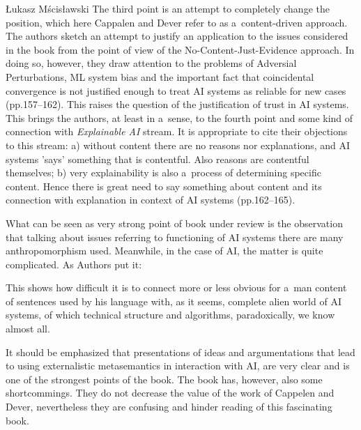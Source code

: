 \begin{newrevengenv}{Łukasz Mścisławski}
The third point is an attempt to completely change the position, which here Cappalen and Dever refer to as a~content-driven approach. The authors sketch an attempt to justify an application to the issues considered in the book from the point of view of the No-Content-Just-Evidence approach. In doing so, however, they draw attention to the problems of Adversial Perturbations, ML system bias and the important fact that coincidental convergence is not justified enough to treat AI systems as reliable for new cases (pp.157--162). This raises the question of the justification of trust in AI systems. This brings the authors, at least in a~sense, to the fourth point and some kind of connection with \textit{Explainable AI} stream. It is appropriate to cite their objections to this stream: a) without content there are no reasons nor explanations, and AI systems 'says' something that is contentful. Also reasons are contentful themselves; b) very explainability is also a~process of determining specific content. Hence there is great need to say something about content and its connection with explanation in context of AI systems (pp.162--165).

What can be seen as very strong point of book under review is the observation that talking about issues referring to functioning of AI systems there are many anthropomorphism used. Meanwhile, in the case of AI, the matter is quite complicated. As Authors put it:

This shows how difficult it is to connect more or less obvious for a~man content of sentences used by his language with, as it seems, complete alien world of AI systems, of which technical structure and algorithms, paradoxically, we know almost all.

It should be emphasized that presentations of ideas and argumentations that lead to using externalistic metasemantics in interaction with AI, are very clear and is one of the strongest points of the book. The book has, however, also some shortcommings. They do not decrease the value of the work of Cappelen and Dever, nevertheless they are confusing and hinder reading of this fascinating book.


\end{newrevengenv}
